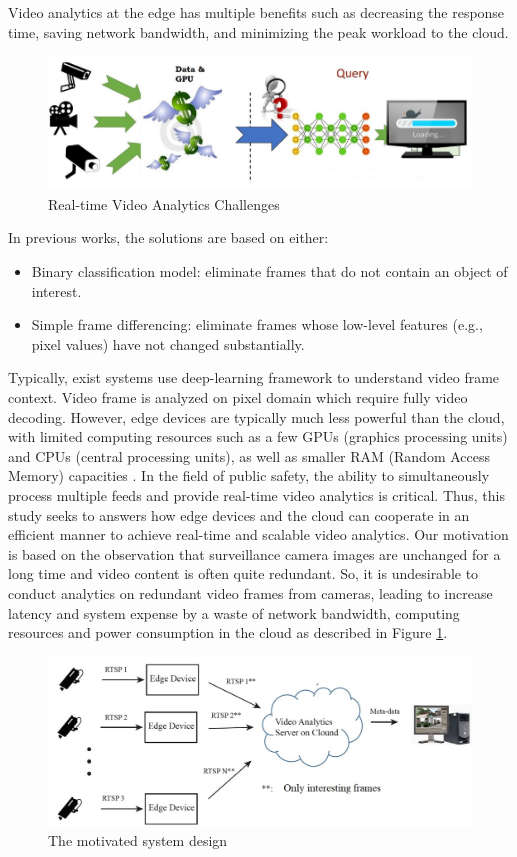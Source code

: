 Video analytics at the edge has multiple benefits such as decreasing the response time, saving network bandwidth, and minimizing the peak workload to the cloud. 
\begin{figure}
\centering
 \includegraphics[width=1.0\linewidth]{Figures/vachallenge.png}
 \caption{Real-time Video Analytics Challenges}
 \label{fig:chal}
\end{figure}
In previous works, the solutions are based on either:
\begin{itemize}
\item Binary classification model\cite{canel2019scaling}\cite{kang2017noscope}: eliminate frames that do not contain an object of interest.
\item Simple frame differencing\cite{chen2015glimpse}: eliminate frames whose low-level
features (e.g., pixel values) have not changed substantially.
\end{itemize}
Typically, exist systems use deep-learning framework to understand video frame context. Video frame is analyzed on pixel domain which require fully video decoding. However, edge devices are typically much less powerful than the cloud, with limited computing resources such as a few GPUs (graphics processing units) and CPUs (central processing units), as well as smaller RAM (Random Access Memory) capacities \cite{stone2019towards}. In the field of public safety, the ability to simultaneously process multiple feeds and provide real-time video analytics is critical. Thus, this study seeks to answers how edge devices and the cloud can cooperate in an efficient manner to achieve real-time and scalable video analytics. Our motivation is based on the observation that surveillance camera images are unchanged for a long time and video content is often quite redundant. So, it is undesirable to conduct analytics on redundant video frames from cameras, leading to increase latency and system expense by a waste of network bandwidth, computing resources and power consumption in the cloud as described in Figure \ref{fig:chal}. \\
\begin{figure}
\centering
 \includegraphics[width=1.0\linewidth]{Figures/motivation.jpg}
 \caption{The motivated system design}
 \label{fig:mot}
\end{figure}
